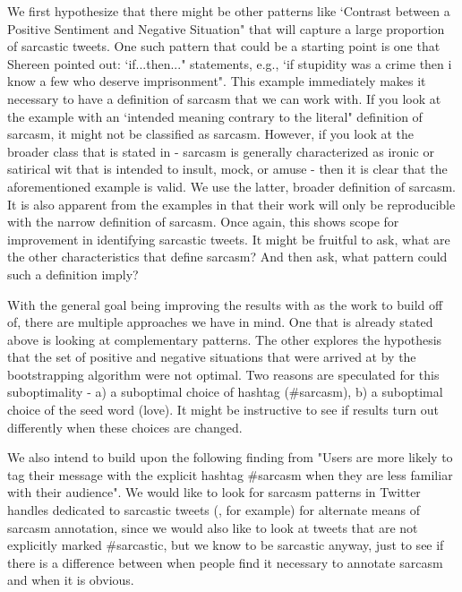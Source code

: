 \documentclass[11pt]{article}
\begin{document}
We first hypothesize that there might be other patterns like `Contrast between a Positive Sentiment and Negative Situation" that will capture a large proportion of sarcastic tweets. One such pattern that could be a starting point is one that Shereen pointed out: `if...then..." statements, e.g., `if stupidity was a crime then i know a few who deserve imprisonment". This example immediately makes it necessary to have a definition of sarcasm that we can work with. If you look at the example with an `intended meaning contrary to the literal" definition of sarcasm, it might not be classified as sarcasm. However, if you look at the broader class that is stated in \cite{riloff2013sarcasm} - sarcasm is generally characterized as ironic or satirical wit that is intended to insult, mock, or amuse - then it is clear that the aforementioned example is valid. We use the latter, broader definition of sarcasm. It is also apparent from the examples in \cite{riloff2013sarcasm} that their work will only be reproducible with the narrow definition of sarcasm. Once again, this shows scope for improvement in identifying sarcastic tweets. It might be fruitful to ask, what are the other characteristics that define sarcasm? And then ask, what pattern could such a definition imply?

With the general goal being improving the results with \cite{riloff2013sarcasm} as the work to build off of, there are multiple approaches we have in mind. One that is already stated above is looking at complementary patterns. The other explores the hypothesis that the set of positive and negative situations that were arrived at by the bootstrapping algorithm were not optimal. Two reasons are speculated for this suboptimality - a) a suboptimal choice of hashtag (\#sarcasm), b) a suboptimal choice of the seed word (love). It might be instructive to see if results turn out differently when these choices are changed.

We also intend to build upon the following finding from \cite{bamman2015contextualized} "Users are more likely to tag their message with the explicit hashtag \#sarcasm when they are less familiar with their audience". We would like to look for sarcasm patterns in Twitter handles dedicated to sarcastic tweets (\@sarcastweet, for example) for alternate means of sarcasm annotation, since we would also like to look at tweets that are not explicitly marked \#sarcastic, but we know to be sarcastic anyway, just to see if there is a difference between when people find it necessary to annotate sarcasm and when it is obvious.
\end{document}
